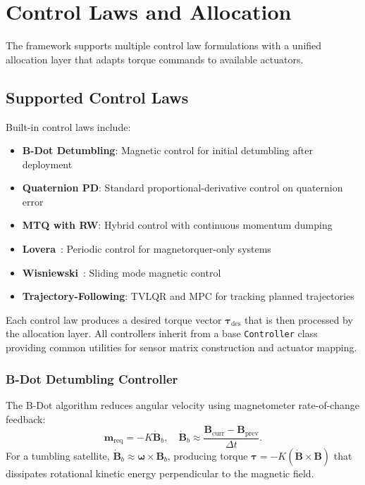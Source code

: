 \documentclass[conference]{IEEEtran}
\begin{document}
\section{Control Laws and Allocation}\label{sec:control}

The framework supports multiple control law formulations with a unified allocation layer that adapts torque commands to available actuators.

\subsection{Supported Control Laws}\label{subsec:control_laws}

Built-in control laws include:

\begin{itemize}
    \item \textbf{B-Dot Detumbling}: Magnetic control for initial detumbling after deployment
    \item \textbf{Quaternion PD}: Standard proportional-derivative control on quaternion error
    \item \textbf{MTQ with RW}: Hybrid control with continuous momentum dumping~\cite{hogan2015}
    \item \textbf{Lovera}~\cite{lovera2004periodic}: Periodic control for magnetorquer-only systems
    \item \textbf{Wisniewski}~\cite{wisniewski1999sliding}: Sliding mode magnetic control
    \item \textbf{Trajectory-Following}: TVLQR and MPC for tracking planned trajectories
\end{itemize}

Each control law produces a desired torque vector $\boldsymbol{\tau}_{\text{des}}$ that is then processed by the allocation layer. All controllers inherit from a base \texttt{Controller} class providing common utilities for sensor matrix construction and actuator mapping.

\subsubsection{B-Dot Detumbling Controller}
The B-Dot algorithm reduces angular velocity using magnetometer rate-of-change feedback:
\begin{equation}
\mathbf{m}_{\text{req}} = -K \dot{\mathbf{B}}_b, \quad \dot{\mathbf{B}}_b \approx \frac{\mathbf{B}_{\text{curr}} - \mathbf{B}_{\text{prev}}}{\Delta t}.
\end{equation}
For a tumbling satellite, $\dot{\mathbf{B}}_b \approx \boldsymbol{\omega} \times \mathbf{B}_b$, producing torque $\boldsymbol{\tau} = -K(\dot{\mathbf{B}} \times \mathbf{B})$ that dissipates rotational kinetic energy perpendicular to the magnetic field.
\end{document}
